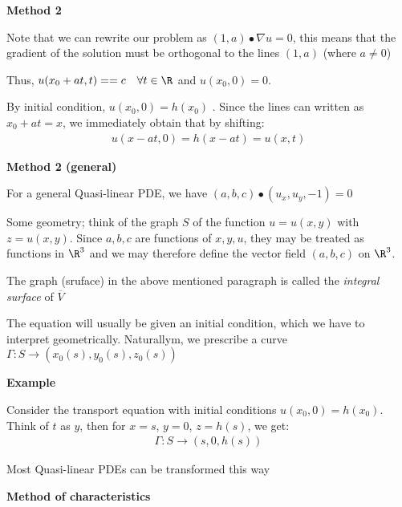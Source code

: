 \noindent\textbf{Method 2}\par
\noindent Note that we can rewrite our problem as $(1,a)\bullet\nabla u=0$, this means that the gradient of the solution must be orthogonal to the lines $(1,a)$ (where $a\neq0$)\par
\noindent Thus, $u(x_0+at,t) = =c\quad\forall t\in\R$ and $u(x_0,0) = 0$.\par
\noindent By initial condition, $u(x_0,0) = h(x_0)$ . Since the lines can written as $x_0+at=x$, we immediately obtain that by shifting:
\begin{equation*}
  \begin{gathered}
    u(x-at,0) = h(x-at) = u(x,t)
  \end{gathered}
\end{equation*}
\par\bigskip
\noindent\textbf{Method 2 (general)}\par
\noindent  For a general Quasi-linear PDE, we have $(a,b,c)\bullet(u_x,u_y,-1) = 0$ \par
\noindent Some geometry; think of the graph $S$ of the function $u = u(x,y)$ with $z = u(x,y)$. Since $a,b,c$ are functions of $x,y,u$, they may be treated as functions in $\R^3$ and we may therefore define the vector field $(a,b,c)$ on $\R^3$.
\par\bigskip
\begin{theo}{}
  The graph (sruface) in the above mentioned paragraph is called the \textit{integral surface} of $\overline{V}$
\end{theo}
\par\bigskip
\noindent The equation will usually be given an initial condition, which we have to interpret geometrically. Naturallym, we prescribe a curve $\Gamma:S\to(x_0(s),y_0(s),z_0(s))$
\par\bigskip
\noindent\textbf{Example}\par
\noindent Consider the transport  equation with initial conditions $u(x_0,0) = h(x_0)$. Think of $t$ as $y$, then for $x = s$, $y = 0$, $z = h(s)$, we get:
\begin{equation*}
  \begin{gathered}
    \Gamma:S\to(s,0,h(s))
  \end{gathered}
\end{equation*}\par
\noindent Most Quasi-linear PDEs can be transformed this way
\par\bigskip
\noindent\textbf{Method of characteristics}\par
